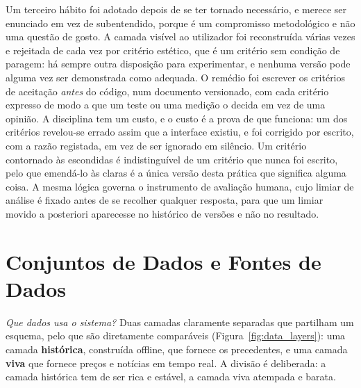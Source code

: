 Um terceiro hábito foi adotado depois de se ter tornado necessário, e merece ser enunciado em vez de
subentendido, porque é um compromisso metodológico e não uma questão de gosto. A camada visível ao
utilizador foi reconstruída várias vezes e rejeitada de cada vez por critério estético, que é um
critério sem condição de paragem: há sempre outra disposição para experimentar, e nenhuma versão pode
alguma vez ser demonstrada como adequada. O remédio foi escrever os critérios de aceitação \emph{antes}
do código, num documento versionado, com cada critério expresso de modo a que um teste ou uma medição o
decida em vez de uma opinião. A disciplina tem um custo, e o custo é a prova de que funciona: um dos
critérios revelou-se errado assim que a interface existiu, e foi corrigido por escrito, com a razão
registada, em vez de ser ignorado em silêncio. Um critério contornado às escondidas é indistinguível de
um critério que nunca foi escrito, pelo que emendá-lo às claras é a única versão desta prática que
significa alguma coisa. A mesma lógica governa o instrumento de avaliação humana, cujo limiar de
análise é fixado antes de se recolher qualquer resposta, para que um limiar movido a posteriori
aparecesse no histórico de versões e não no resultado.

\section{Conjuntos de Dados e Fontes de Dados}
\label{sec:met_data}

\emph{Que dados usa o sistema?} Duas camadas claramente separadas que partilham um esquema, pelo que são
diretamente comparáveis (Figura~\ref{fig:data_layers}): uma camada \textbf{histórica}, construída offline,
que fornece os precedentes, e uma camada \textbf{viva} que fornece preços e notícias em tempo real. A
divisão é deliberada: a camada histórica tem de ser rica e estável, a camada viva atempada e barata.

